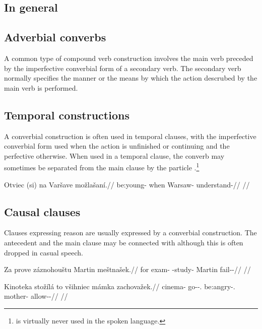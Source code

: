 \subsection{In general}

\subsection{Adverbial converbs}

A common type of compound verb construction involves the main verb preceded by the imperfective converbial form of a secondary verb. The secondary verb normally specifies the manner or the means by which the action descrubed by the main verb is performed.


\subsection{Temporal constructions}

A converbial construction is often used in temporal clauses, with the imperfective converbial form used when the action is unfinished or continuing and the perfective otherwise. When used in a temporal clause, the converb may sometimes be separated from the main clause by the particle .\footnote{ is virtually never used in the spoken language.}

\pex
\begingl
\gla Otviec (si) na Varšave možlašaní.//
\glb be:young- when \Loc{} Warsaw-\Pat{} understand-//
\glft {}//
\endgl
\xe

\subsection{Causal clauses}

Clauses expressing reason are usually expressed by a converbial construction. The antecedent and the main clause may be connected with  although this is often dropped in casual speech.

\pex
\begingl
\gla Za prove záznohouštu Martin meštnašek.//
\glb for exam-\Pat{} \Neg{}-study- Martin fail-\Av{}-\Pf{}//
\glft {}//
\endgl
\xe


\pex
\begingl
\gla Kinoteka stožílá to všihniec mámka zachovažek.//
\glb cinema-\Pat{} go-\Av{}-\Sbj{}.\Ipf{} \Rz{} be:angry-\Cv{}.\Ipf{} mother-\Dim{} allow-\Av{}-\Pf{}//
\glft {}//
\endgl
\xe



